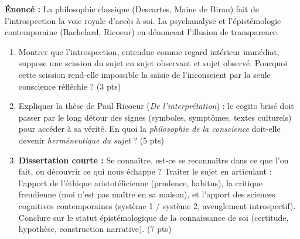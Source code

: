 \documentclass[11pt]{article}
\begin{document}
\begin{exercice}
\textbf{Énoncé :} La philosophie classique (Descartes, Maine de Biran) fait de l'introspection la voie royale d'accès à soi. La psychanalyse et l'épistémologie contemporaine (Bachelard, Ricoeur) en dénoncent l'illusion de transparence.
\begin{enumerate}
    \item Montrer que l'introspection, entendue comme \og regard intérieur \fg{} immédiat, suppose une scission du sujet en sujet observant et sujet observé. Pourquoi cette scission rend-elle impossible la saisie de l'inconscient par la seule conscience réfléchie ? (3 pts)
    \item Expliquer la thèse de Paul Ricoeur (\textit{De l'interprétation}) : le \og cogito brisé \fg{} doit passer par le \og long détour \fg{} des signes (symboles, symptômes, textes culturels) pour accéder à sa vérité. En quoi la \textit{philosophie de la conscience} doit-elle devenir \textit{herméneutique du sujet} ? (5 pts)
    \item \textbf{Dissertation courte :} \og Se connaître, est-ce se reconnaître dans ce que l'on fait, ou découvrir ce qui nous échappe ? \fg{} Traiter le sujet en articulant : l'apport de l'éthique aristotélicienne (prudence, habitus), la critique freudienne (moi n'est pas maître en sa maison), et l'apport des sciences cognitives contemporaines (système 1 / système 2, aveuglement introspectif). Conclure sur le statut épistémologique de la \og connaissance de soi \fg{} (certitude, hypothèse, construction narrative). (7 pts)
\end{enumerate}
\end{exercice}
\end{document}
